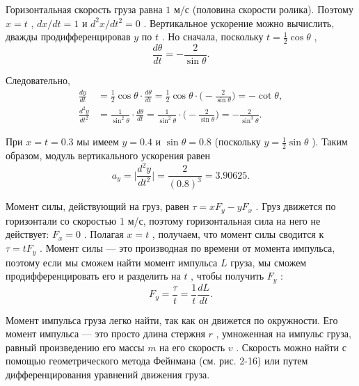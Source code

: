 \documentclass[11pt,oneside]{article}
\providecommand{\ddt}[2]{\frac{d#1}{d#2}}
\begin{document}
Горизонтальная скорость груза равна \(1\) м/с (половина скорости ролика). Поэтому \(x = t\) , \(dx/dt = 1\) и \(d^2x/dt^2 = 0\) . Вертикальное ускорение можно вычислить, дважды продифференцировав \(y\) по \(t\) . Но сначала, поскольку \(t = \frac12\cos\theta\) , 
\begin{equation*} \ddt{\theta}{t} = -\frac{2}{\sin\theta}. \end{equation*}
\par

Следовательно, 
\begin{equation*} \begin{aligned} \ddt{y}{t} &= {\textstyle\frac12}\cos\theta \cdot \ddt{\theta}{t} = {\textstyle\frac12}\cos\theta \cdot\biggl(-\frac{2}{\sin\theta}\biggr) = -\cot\theta,\\[2ex] \frac{d^2y}{dt^2} &= \frac{1}{\sin^2\theta}\cdot \ddt{\theta}{t} = \frac{1}{\sin^2\theta}\cdot\biggl(-\frac{2}{\sin\theta}\biggr) = -\frac{2}{\sin^3\theta}. \end{aligned} \end{equation*}
\par

При \(x=t=0.3\) мы имеем \(y=0.4\) и \(\sin\theta=0.8\) (поскольку \(y=\frac12\sin\theta\) ). Таким образом, модуль вертикального ускорения равен 
\begin{equation*} a_y = \biggl|\frac{d^2y}{dt^2}\biggr| = \frac{2}{(0.8)^3} = 3.90625. \end{equation*}
\par

Момент силы, действующий на груз, равен \(\tau=xF_y-yF_x\) . Груз движется по горизонтали со скоростью \(1\) м/с, поэтому горизонтальная сила на него не действует: \(F_x=0\) . Полагая \(x=t\) , получаем, что момент силы сводится к \(\tau=tF_y\) . Момент силы --- это производная по времени от момента импульса, поэтому если мы сможем найти момент импульса \(L\) груза, мы сможем продифференцировать его и разделить на \(t\) , чтобы получить \(F_y\) : 
\begin{equation*} F_y = \frac{\tau}{t}=\frac{1}{t}\ddt{L}{t}. \end{equation*}
\par

Момент импульса груза легко найти, так как он движется по окружности. Его момент импульса --- это просто длина стержня \(r\) , умноженная на импульс груза, равный произведению его массы \(m\) на его скорость \(v\) . Скорость можно найти с помощью геометрического метода Фейнмана (см. рис. 2-16) или путем дифференцирования уравнений движения груза.\par
\end{document}
